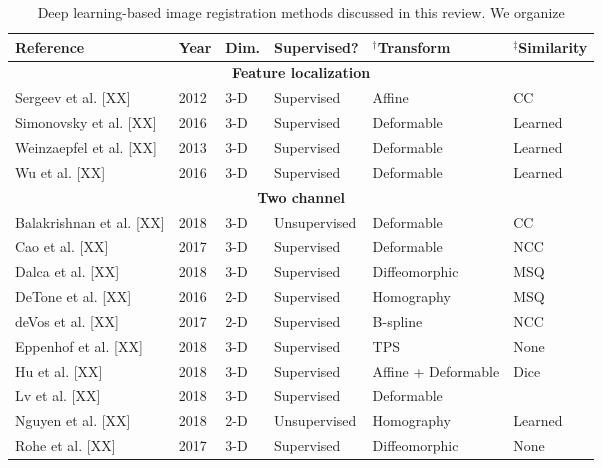 

\begin{table}[!htb]
\centering
\caption{Deep learning-based image registration methods discussed in this review. We organize}
\label{table:methods}
\begin{tabular*}{\textwidth}{l@{\extracolsep{\fill}}l@{\extracolsep{\fill}}l@{\extracolsep{\fill}}l@{\extracolsep{\fill}}l@{\extracolsep{\fill}}l}
\toprule
\midrule
\textbf{Reference} & \textbf{Year} & \textbf{Dim.} & \textbf{Supervised?} & $^\dagger$\textbf{Transform} & $^\ddagger$\textbf{Similarity} \\
\midrule
\midrule
\multicolumn{6}{c}{\textbf{Feature localization}}
  \vspace{0.25cm} \\
  Sergeev et al. [XX] & 2012 & 3-D & Supervised & Affine & CC \\
  Simonovsky et al. [XX] & 2016 & 3-D & Supervised & Deformable & Learned \\
  Weinzaepfel et al. [XX] & 2013 & 3-D & Supervised & Deformable & Learned \\
  Wu et al. [XX] & 2016 & 3-D & Supervised & Deformable & Learned \\
\midrule
\multicolumn{6}{c}{\textbf{Two channel}}
  \vspace{0.25cm} \\
  Balakrishnan et al. [XX] & 2018 & 3-D & Unsupervised & Deformable & CC \\
  Cao et al. [XX] & 2017 & 3-D & Supervised & Deformable & NCC \\
  Dalca et al. [XX] & 2018 & 3-D & Supervised & Diffeomorphic & MSQ \\
  DeTone et al. [XX] & 2016 & 2-D & Supervised & Homography & MSQ \\
  deVos et al. [XX] & 2017 & 2-D & Supervised & B-spline & NCC \\
  Eppenhof et al. [XX] & 2018 & 3-D & Supervised & TPS & None \\       %
  Hu et al. [XX] & 2018 & 3-D & Supervised & Affine + Deformable & Dice \\
  Lv et al. [XX] & 2018 & 3-D & Supervised & Deformable & {} \\
  Nguyen et al. [XX] & 2018 & 2-D & Unsupervised & Homography & Learned \\
  Rohe et al. [XX] & 2017 & 3-D & Supervised & Diffeomorphic & None \\  %

\end{tabular*}
\end{table}
